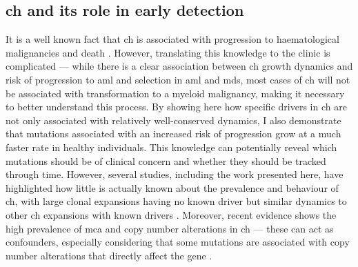\subsection{\Ac{ch} and its role in early detection} 

It is a well known fact that \ac{ch} is associated with progression to haematological malignancies and death \cite{Genovese2014-eu,Jaiswal2014-rl,Abelson2018-wh}. However, translating this knowledge to the clinic is complicated --- while there is a clear association between \ac{ch} growth dynamics and risk of progression to \ac{aml} and selection in \ac{aml} and \ac{mds}, most cases of \ac{ch} will not be associated with transformation to a myeloid malignancy, making it necessary to better understand this process. By showing here how specific drivers in \ac{ch} are not only associated with relatively well-conserved dynamics, I also demonstrate that mutations associated with an increased risk of progression grow at a much faster rate in healthy individuals. This knowledge can potentially reveal which mutations should be of clinical concern and whether they should be tracked through time. However, several studies, including the work presented here, have highlighted how little is actually known about the prevalence and behaviour of \ac{ch}, with large clonal expansions having no known driver but similar dynamics to other \ac{ch} expansions with known drivers \cite{Poon2020-ek,Mitchell2021-zl,Fabre2021-uw}. Moreover, recent evidence shows the high prevalence of \ac{mca} and copy number alterations in \ac{ch} --- these can act as confounders, especially considering that some mutations are associated with copy number alterations that directly affect the gene \cite{Gao2021-ph,Saiki2021-sq}. 


